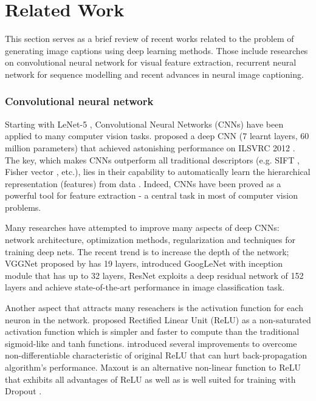 \section{Related Work}
	This section serves as a brief review of recent works related to the problem of generating image captions using deep learning methods. Those include researches on convolutional neural network for visual feature extraction, recurrent neural network for sequence modelling and recent advances in neural image captioning.
	
		\subsubsection{Convolutional neural network} 
		Starting with LeNet-5 \cite{lecun-98}, Convolutional Neural Networks (CNNs) have been applied to many computer vision tasks. \cite{NIPS2012_4824} proposed a deep CNN (7 learnt layers, $60$ million parameters) that achieved astonishing performance on ILSVRC 2012 \cite{ILSVRC15}. The key, which makes CNNs outperform all traditional descriptors (e.g. SIFT \cite{790410}, Fisher vector \cite{Sanchez2013}, etc.), lies in their capability to automatically learn the hierarchical representation (features) from data \cite{farabet2013learning}.  Indeed, CNNs have been proved as a powerful tool for feature extraction \cite{NIPS2012_4824, Simonyan14c, DBLP:journals/corr/SzegedyLJSRAEVR14, DBLP:journals/corr/HeZRS15} - a central task in most of computer vision problems. 

		Many researches have attempted to improve many aspects of deep CNNs: network architecture, optimization methods, regularization and techniques for training deep nets. The recent trend is to increase the depth of the network; VGGNet proposed by \cite{Simonyan14c} has 19 layers, \cite{DBLP:journals/corr/SzegedyLJSRAEVR14} introduced GoogLeNet with inception module that has up to 32 layers, ResNet \cite{DBLP:journals/corr/HeZRS15} exploits a deep residual network of 152 layers and achieve state-of-the-art performance in image classification task.

		Another aspect that attracts many reseachers is the activation function for each neuron in the network. \cite{icml2010_NairH10} proposed Rectified Linear Unit (ReLU) as a non-saturated activation function which is simpler and faster to compute than the traditional sigmoid-like and tanh functions. \cite{maas2013rectifier, DBLP:journals/corr/HeZR015,DBLP:journals/corr/XuWCL15} introduced several improvements to overcome non-differentiable characteristic of original ReLU that can hurt back-propagation algorithm's performance. Maxout \cite{goodfellow2013maxout} is an alternative non-linear function to ReLU that exhibits all advantages of ReLU as well as is well suited for training with Dropout \cite{DBLP:journals/corr/abs-1207-0580}.

